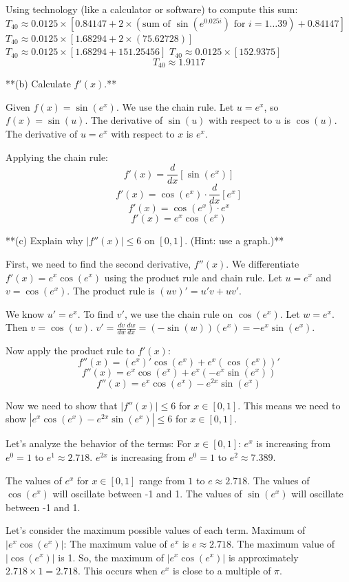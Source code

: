 \documentclass{article}
\begin{document}
Using technology (like a calculator or software) to compute this sum:
$T_{40} \approx 0.0125 \times [0.84147 + 2 \times (\text{sum of } \sin(e^{0.025i}) \text{ for } i=1 \dots 39) + 0.84147]$
$T_{40} \approx 0.0125 \times [1.68294 + 2 \times (75.62728)]$
$T_{40} \approx 0.0125 \times [1.68294 + 151.25456]$
$T_{40} \approx 0.0125 \times [152.9375]$
$$T_{40} \approx 1.9117$$

**(b) Calculate $f'(x)$.**

Given $f(x) = \sin(e^x)$. We use the chain rule. Let $u = e^x$, so $f(x) = \sin(u)$.
The derivative of $\sin(u)$ with respect to $u$ is $\cos(u)$.
The derivative of $u = e^x$ with respect to $x$ is $e^x$.

Applying the chain rule:
$$f'(x) = \frac{d}{dx}[\sin(e^x)]$$
$$f'(x) = \cos(e^x) \cdot \frac{d}{dx}[e^x]$$
$$f'(x) = \cos(e^x) \cdot e^x$$
$$f'(x) = e^x \cos(e^x)$$

**(c) Explain why $|f''(x)| \leq 6$ on $[0, 1]$. (Hint: use a graph.)**

First, we need to find the second derivative, $f''(x)$. We differentiate $f'(x) = e^x \cos(e^x)$ using the product rule and chain rule.
Let $u = e^x$ and $v = \cos(e^x)$.
The product rule is $(uv)' = u'v + uv'$.

We know $u' = e^x$.
To find $v'$, we use the chain rule on $\cos(e^x)$. Let $w = e^x$. Then $v = \cos(w)$.
$v' = \frac{dv}{dw} \frac{dw}{dx} = (-\sin(w))(e^x) = -e^x \sin(e^x)$.

Now apply the product rule to $f'(x)$:
$$f''(x) = (e^x)' \cos(e^x) + e^x (\cos(e^x))'$$
$$f''(x) = e^x \cos(e^x) + e^x (-e^x \sin(e^x))$$
$$f''(x) = e^x \cos(e^x) - e^{2x} \sin(e^x)$$

Now we need to show that $|f''(x)| \leq 6$ for $x \in [0, 1]$.
This means we need to show $|e^x \cos(e^x) - e^{2x} \sin(e^x)| \leq 6$ for $x \in [0, 1]$.

Let's analyze the behavior of the terms:
For $x \in [0, 1]$:
$e^x$ is increasing from $e^0 = 1$ to $e^1 \approx 2.718$.
$e^{2x}$ is increasing from $e^0 = 1$ to $e^2 \approx 7.389$.

The values of $e^x$ for $x \in [0, 1]$ range from $1$ to $e \approx 2.718$.
The values of $\cos(e^x)$ will oscillate between -1 and 1.
The values of $\sin(e^x)$ will oscillate between -1 and 1.

Let's consider the maximum possible values of each term.
Maximum of $|e^x \cos(e^x)|$: The maximum value of $e^x$ is $e \approx 2.718$. The maximum value of $|\cos(e^x)|$ is 1. So, the maximum of $|e^x \cos(e^x)|$ is approximately $2.718 \times 1 = 2.718$. This occurs when $e^x$ is close to a multiple of $\pi$.
\end{document}
